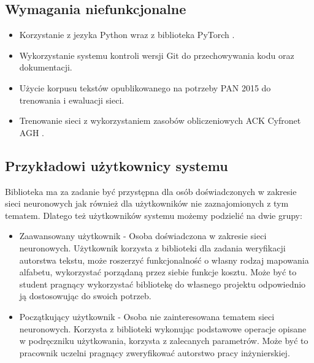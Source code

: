 \subsection{Wymagania niefunkcjonalne}
\begin{itemize}
 	\item Korzystanie z jezyka Python wraz z biblioteka PyTorch \cite{pytorch}.
 	\item Wykorzystanie systemu kontroli wersji Git do przechowywania kodu oraz dokumentacji.
 	\item Użycie korpusu tekstów opublikowanego na potrzeby PAN 2015 \cite{pan} do trenowania i ewaluacji sieci.
 	\item Trenowanie sieci z wykorzystaniem zasobów obliczeniowych ACK Cyfronet AGH \cite{plgrid}.
\end{itemize}

\subsection{Przykładowi użytkownicy systemu}
Biblioteka ma za zadanie być przystępna dla osób doświadczonych w zakresie sieci neuronowych jak również
dla użytkowników nie zaznajomionych z tym tematem. Dlatego też użytkowników systemu możemy podzielić 
na dwie grupy:
\begin{itemize}
 	\item Zaawansowany użytkownik - Osoba doświadczona w zakresie sieci neuronowych. Użytkownik korzysta
 	z biblioteki dla zadania weryfikacji autorstwa tekstu, może roszerzyć funkcjonalność o własny rodzaj
 	mapowania alfabetu, wykorzystać porządaną przez siebie funkcje kosztu. Może być to student pragnący
 	wykorzystać bibliotekę do własnego projektu odpowiednio ją dostosowując do swoich potrzeb.
 	\item Początkujący użytkownik - Osoba nie zainteresowana tematem sieci neuronowych. Korzysta z biblioteki
 	wykonując podstawowe operacje opisane w podręczniku użytkowania, korzysta z zalecanych parametrów.
 	Może być to pracownik uczelni pragnący zweryfikować autorstwo pracy inżynierskiej.
\end{itemize}
